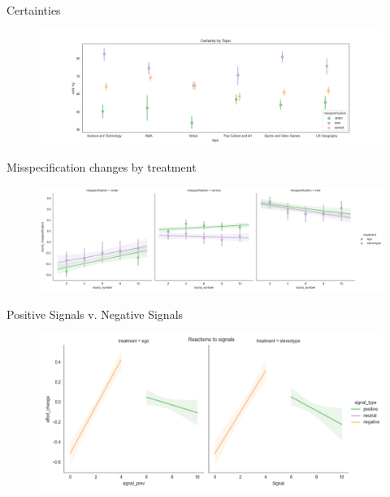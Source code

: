 \documentclass[aspectratio=169]{beamer}
\begin{document}
\begin{frame}{Certainties}
    \label{certainties}
    \begin{figure}
        \centering
        \includegraphics[scale=.4]{certainty_by_topic.png}
    \end{figure}

\end{frame}

\begin{frame}{Misspecification changes by treatment}
    \label{misspecificationsrounds}
    \begin{figure}
        \centering
        \includegraphics[scale=.4]{misspecification_evolution_tratment.png}
    \end{figure}
\end{frame}

\begin{frame}{Positive Signals v. Negative Signals}
    \label{positivevnegative}
    \begin{figure}
        \centering
        \includegraphics[scale=.5]{signalvalue_effort_change.png}
    \end{figure}

\end{frame}
\end{document}
